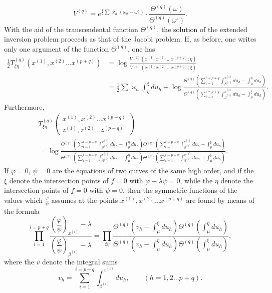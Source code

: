 \documentclass[10pt]{article}
\begin{document}
\[
V^{(q)}=e^{\frac12\sum\varkappa_h(\omega_h-\omega_h^\circ)}\cdot
\frac{\Theta^{(q)}(\omega)}{\Theta^{(q)}(\omega^\circ)}.
\]
With the aid of the transcendental function \(\Theta^{(q)}\), the solution of the extended inversion problem proceeds as that of the Jacobi problem. If, as before, one writes only one argument of the function \(\Theta^{(q)}\), one has
\[
\begin{aligned}
\frac12T_{\xi\eta}^{(q)}(x^{(1)},x^{(2)}\ldots x^{(p+q)})
&=\log\frac{V^{(q)}(x^{(1)}x^{(2)}\ldots x^{(p+q)};\eta)}{V^{(q)}(x^{(1)}x^{(2)}\ldots x^{(p+q)};\xi)}\\
&=\frac12\sum\varkappa_h\int_{\eta}^{\xi}du_h+
\log\frac{\Theta^{(q)}\left(\sum_{i=1}^{i=p+q}\int_{\beta^{(i)}}^{x^{(i)}}du_h-\int_{\mu}^{\eta}du_h\right)}{\Theta^{(q)}\left(\sum_{i=1}^{i=p+q}\int_{\beta^{(i)}}^{x^{(i)}}du_h-\int_{\mu}^{\xi}du_h\right)}.
\end{aligned}
\]
Furthermore,
\[
\begin{aligned}
&T_{\xi\eta}^{(q)}
\begin{pmatrix}
x^{(1)},x^{(2)}\ldots x^{(p+q)}\\
z^{(1)},z^{(2)}\ldots z^{(p+q)}
\end{pmatrix}\\
&=\log\frac{
\Theta^{(q)}\left(\sum_{i=1}^{i=p+q}\int_{\beta^{(i)}}^{x^{(i)}}du_h-\int_{\mu}^{\eta}du_h\right)
\Theta^{(q)}\left(\sum_{i=1}^{i=p+q}\int_{\beta^{(i)}}^{z^{(i)}}du_h-\int_{\mu}^{\xi}du_h\right)
}{
\Theta^{(q)}\left(\sum_{i=1}^{i=p+q}\int_{\beta^{(i)}}^{z^{(i)}}du_h-\int_{\mu}^{\eta}du_h\right)
\Theta^{(q)}\left(\sum_{i=1}^{i=p+q}\int_{\beta^{(i)}}^{x^{(i)}}du_h-\int_{\mu}^{\xi}du_h\right)
}.
\end{aligned}
\]
If \(\varphi=0\), \(\psi=0\) are the equations of two curves of the same high order, and if the \(\xi\) denote the intersection points of \(f=0\) with \(\varphi-\lambda\psi=0\), while the \(\eta\) denote the intersection points of \(f=0\) with \(\psi=0\), then the symmetric functions of the values which \(\frac{\varphi}{\psi}\) assumes at the points \(x^{(1)},x^{(2)}\ldots x^{(p+q)}\) are found by means of the formula
\[
\prod_{i=1}^{i=p+q}
\frac{\left(\dfrac{\varphi}{\psi}\right)_{x^{(i)}}-\lambda}{\left(\dfrac{\varphi}{\psi}\right)_{\beta^{(i)}}-\lambda}
=\prod_{\xi\eta}
\frac{
\Theta^{(q)}\left(v_h-\int_{\mu}^{\xi}du_h\right)
\Theta^{(q)}\left(\int_{\mu}^{\eta}du_h\right)
}{
\Theta^{(q)}\left(v_h-\int_{\mu}^{\eta}du_h\right)
\Theta^{(q)}\left(\int_{\mu}^{\xi}du_h\right)
},
\]
where the \(v\) denote the integral sums
\[
v_h=\sum_{i=1}^{i=p+q}\int_{\beta^{(i)}}^{x^{(i)}}du_h,
\qquad (h=1,2\ldots p+q).
\]
\end{document}
